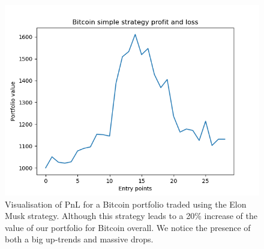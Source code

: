 \documentclass[twoside]{report}
\begin{document}
\begin{spacing}{1}
\begin{figure}[!htbp]
    \centering
    \includegraphics[scale = 0.5]{TestPlots/plot-BTC-pnl.png}
    \caption{Visualisation of PnL for a Bitcoin portfolio traded using the Elon Musk strategy. Although this strategy leads to a 20\% increase of the value of our portfolio for Bitcoin overall. We notice the presence of both a big up-trends and massive drops.}
    \label{fig:elon_btc_pnl}
\end{figure}


\end{spacing}
\end{document}
